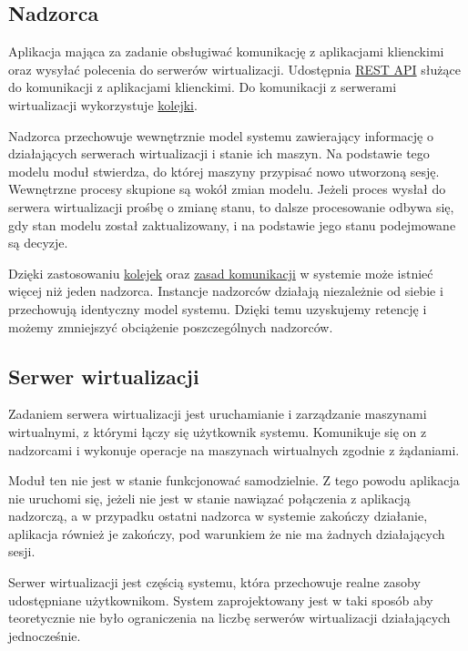 \documentclass[../opis-rozwiazania.tex]{subfiles}
\begin{document}
\subsection{Nadzorca}
\label{modules:overseer}

Aplikacja mająca za zadanie obsługiwać komunikację z aplikacjami klienckimi oraz wysyłać polecenia do serwerów wirtualizacji. Udostępnia \hyperref[communication:api]{REST API} służące do komunikacji z aplikacjami klienckimi. Do komunikacji z serwerami wirtualizacji wykorzystuje \hyperref[modules:broker]{kolejki}.

Nadzorca przechowuje wewnętrznie model systemu zawierający informację o działających serwerach wirtualizacji i stanie ich maszyn. Na podstawie tego modelu moduł stwierdza, do której maszyny przypisać nowo utworzoną sesję. Wewnętrzne procesy skupione są wokół zmian modelu. Jeżeli proces wysłał do serwera wirtualizacji prośbę o zmianę stanu, to dalsze procesowanie odbywa się, gdy stan modelu został zaktualizowany, i na podstawie jego stanu podejmowane są decyzje.


Dzięki zastosowaniu \hyperref[modules:broker]{kolejek} oraz \hyperref[communication:broker]{zasad komunikacji} w systemie może istnieć więcej niż jeden nadzorca. Instancje nadzorców działają niezależnie od siebie i przechowują identyczny model systemu. Dzięki temu uzyskujemy retencję i możemy zmniejszyć obciążenie poszczególnych nadzorców.

\subsection{Serwer wirtualizacji}
\label{modules:virtsrv}

Zadaniem serwera wirtualizacji jest uruchamianie i zarządzanie maszynami wirtualnymi, z którymi łączy się użytkownik systemu. Komunikuje się on z nadzorcami i wykonuje operacje na maszynach wirtualnych zgodnie z żądaniami.

Moduł ten nie jest w stanie funkcjonować samodzielnie. Z tego powodu aplikacja nie uruchomi się, jeżeli nie jest w stanie nawiązać połączenia z aplikacją nadzorczą, a w przypadku ostatni nadzorca w systemie zakończy działanie, aplikacja również je zakończy, pod warunkiem że nie ma żadnych działających sesji.

Serwer wirtualizacji jest częścią systemu, która przechowuje realne zasoby udostępniane użytkownikom.
System zaprojektowany jest w taki sposób aby teoretycznie nie było ograniczenia na liczbę serwerów wirtualizacji działających jednocześnie.
\end{document}
